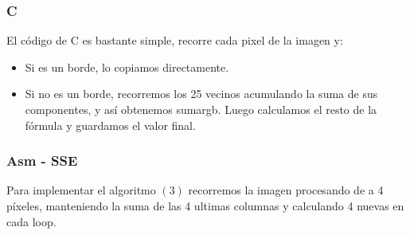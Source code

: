 \subsubsection{C}

El código de C es bastante simple, recorre cada pixel de la imagen y:

\begin{itemize}
    \item Si es un borde, lo copiamos directamente.

    \item Si no es un borde, recorremos los 25 vecinos acumulando la suma de sus componentes, y así obtenemos sumargb.
        Luego calculamos el resto de la fórmula y guardamos el valor final.
\end{itemize}

\subsubsection{Asm - SSE}

Para implementar el algoritmo $(3)$ recorremos la imagen procesando de a 4 píxeles, manteniendo la suma de las 4 ultimas columnas y calculando 4 nuevas en cada loop.


